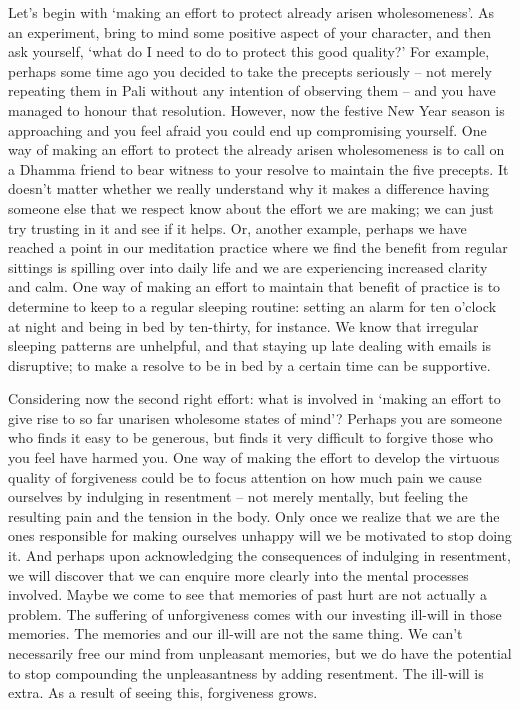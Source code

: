 Let's begin with `making an effort to protect already arisen
wholesomeness'. As an experiment, bring to mind some positive aspect of
your character, and then ask yourself, `what do I need to do to protect
this good quality?' For example, perhaps some time ago you decided to
take the precepts seriously -- not merely repeating them in Pali without
any intention of observing them -- and you have managed to honour that
resolution. However, now the festive New Year season is approaching and
you feel afraid you could end up compromising yourself. One way of
making an effort to protect the already arisen wholesomeness is to call
on a Dhamma friend to bear witness to your resolve to maintain the five
precepts. It doesn't matter whether we really understand why it makes a
difference having someone else that we respect know about the effort we
are making; we can just try trusting in it and see if it helps. Or,
another example, perhaps we have reached a point in our meditation
practice where we find the benefit from regular sittings is spilling
over into daily life and we are experiencing increased clarity and calm.
One way of making an effort to maintain that benefit of practice is to
determine to keep to a regular sleeping routine: setting an alarm for
ten o'clock at night and being in bed by ten-thirty, for instance. We
know that irregular sleeping patterns are unhelpful, and that staying up
late dealing with emails is disruptive; to make a resolve to be in bed
by a certain time can be supportive.

Considering now the second right effort: what is involved in `making an
effort to give rise to so far unarisen wholesome states of mind'?
Perhaps you are someone who finds it easy to be generous, but finds it
very difficult to forgive those who you feel have harmed you. One way of
making the effort to develop the virtuous quality of forgiveness could
be to focus attention on how much pain we cause ourselves by indulging
in resentment -- not merely mentally, but feeling the resulting pain and
the tension in the body. Only once we realize that we are the ones
responsible for making ourselves unhappy will we be motivated to stop
doing it. And perhaps upon acknowledging the consequences of indulging
in resentment, we will discover that we can enquire more clearly into
the mental processes involved. Maybe we come to see that memories of
past hurt are not actually a problem. The suffering of unforgiveness
comes with our investing ill-will in those memories. The memories and
our ill-will are not the same thing. We can't necessarily free our mind
from unpleasant memories, but we do have the potential to stop
compounding the unpleasantness by adding resentment. The ill-will is
extra. As a result of seeing this, forgiveness grows.

